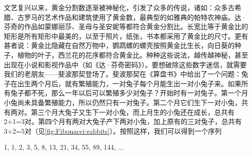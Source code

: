 \documentclass[b5paper]{ctexart}
\begin{document}
文艺复兴以来，黄金分割数逐渐被神秘化，引发了众多的传说，诸如：众多古希腊、古罗马的艺术作品和建筑使用了黄金数，最典型的如雅典的帕特农神庙。达·芬奇的作品如蒙娜丽莎、圣母与圣安妮等都符合黄金分割比。长宽比等于黄金比的矩形是所有矩形中最美的，以至于照片，纸张，书本都采用了黄金比的尺寸。更有甚者说：黄金比隐藏在自然万物中，鹦鹉螺的螺壳按照黄金比生长，向日葵的种子，植物的叶子，西兰花的花序都符合黄金比。种种这些说法，越传越神秘，甚至出现在小说和影视作品中（如《达·芬奇密码》）。要想破除这些数字迷信，就需要我们的老朋友——斐波那契登场了。斐波那契在《算盘书》中给出了一个问题：兔子在出生两个月后，就有繁殖能力，一对兔子每个月能生出一对小兔子来。如果所有兔子都不死，那么一年以后可以繁殖多少对兔子？开始时有一对兔子。第一个月小兔尚未具备繁殖能力，所以仍然只有一对兔子。第二个月它们生下一对小兔，共有两对。第三个月大兔子又生下一对小兔，而上月生的小兔还在成长，总共有2+1=3对。第四个月有两对大兔子产下两对小兔，加上原有的三对兔子，总共有3+2=5对（见\cref{fig:Fibonacci-rabbits}）。按照这样，我们可以得到一个序列

1, 1, 2, 3, 5, 8, 13, 21, 34, 55, 89, 144, ...
\end{document}
